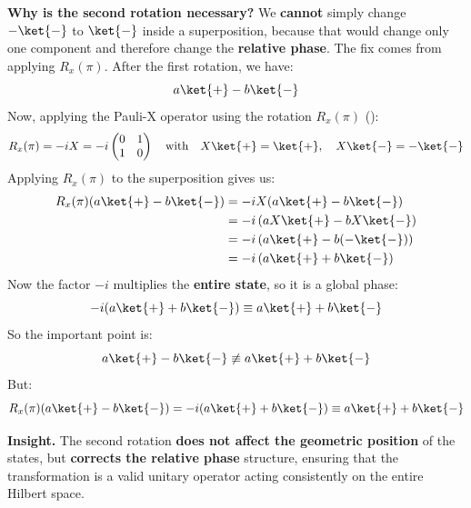 \begin{enumerate}
    \textcolor{Green3}{ \textbf{Why is the second rotation necessary?}} We \textbf{cannot} simply change $-\ket{-}$ to $\ket{-}$ inside a superposition, because that would change only one component and therefore change the \textbf{relative phase}. The fix comes from applying $R_x(\pi)$. After the first rotation, we have:
    \begin{equation*}
        a\ket{+} - b\ket{-}
    \end{equation*}
    Now, applying the Pauli-X operator using the rotation $R_x(\pi)$ ():
    \begin{equation*}
        R_x(\pi) = -iX = -i \begin{pmatrix}
            0 & 1 \\ 1 & 0
        \end{pmatrix} \quad \text{with} \quad X\ket{+} = \ket{+}, \quad X\ket{-} = -\ket{-}
    \end{equation*}
    Applying $R_x(\pi)$ to the superposition gives us:
    \begin{align*}
        R_x(\pi)(a\ket{+} - b\ket{-}) &= -iX(a\ket{+} - b\ket{-}) \\
        &= -i\left(aX\ket{+} - bX\ket{-}\right) \\
        &= -i\left(a\ket{+} - b(-\ket{-})\right) \\
        &= -i\left(a\ket{+} + b\ket{-}\right)
    \end{align*}
    Now the factor $-i$ multiplies the \textbf{entire state}, so it is a global phase:
    \begin{equation*}
        -i(a\ket{+} + b\ket{-}) \equiv a\ket{+} + b\ket{-}
    \end{equation*}
    So the important point is:
    \begin{equation*}
        a\ket{+} - b\ket{-} \not\equiv a\ket{+} + b\ket{-}
    \end{equation*}
    But:
    \begin{equation*}
        R_x(\pi)(a\ket{+} - b\ket{-}) = -i(a\ket{+} + b\ket{-}) \equiv a\ket{+} + b\ket{-}
    \end{equation*}

    \textcolor{Green3}{ \textbf{Insight.}} The second rotation \textbf{does not affect the geometric position} of the states, but \textbf{corrects the relative phase} structure, ensuring that the transformation is a valid unitary operator acting consistently on the entire Hilbert space.


\end{enumerate}
